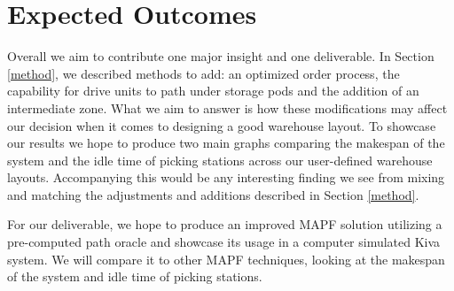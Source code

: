 \documentclass[a4paper,11pt]{article}
\begin{document}
\section{Expected Outcomes}
Overall we aim to contribute one major insight and one deliverable. In Section \ref{method}, we described methods to add: an optimized order process, the capability for drive units to path under storage pods and the addition of an intermediate zone. What we aim to answer is how these modifications may affect our decision when it comes to designing a good warehouse layout. To showcase our results we hope to produce two main graphs comparing the makespan of the system and the idle time of picking stations across our user-defined warehouse layouts. Accompanying this would be any interesting finding we see from mixing and matching the adjustments and additions described in Section \ref{method}. 

For our deliverable, we hope to produce an improved MAPF solution utilizing a pre-computed path oracle and showcase its usage in a computer simulated Kiva system. We will compare it to other MAPF techniques, looking at the makespan of the system and idle time of picking stations.



\end{document}
